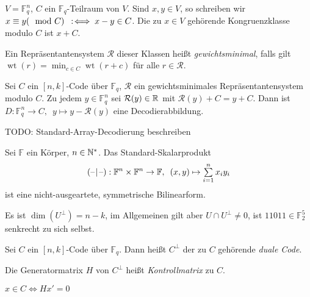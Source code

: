 \documentclass{cheat-sheet}
\newcommand{\F}{\mathbb{F}} %
\DeclareMathOperator{\wt}{wt} %
\newcommand{\scp}[2]{\left( #1 \!\mid\! #2 \right)} %
\begin{document}
$V = \F_q^n$, $C$ ein $\F_q$-Teilraum von $V$.
Sind $x, y \in V$, so schreiben wir $x \equiv y (\mod C) \enspace:\!\iff x-y \in C$.
Die zu $x \in V$ gehörende Kongruenzklasse modulo $C$ ist $x + C$.

\begin{defn}
  Ein Repräsentantensystem $\mathcal{R}$ dieser Klassen heißt \emph{gewichtsminimal}, falls gilt $\wt(r) = \min_{c \in C} \wt(r+c)$ für alle $r \in \mathcal{R}$.
\end{defn}

\begin{satz}
  Sei $C$ ein $[n, k]$-Code über $\F_q$, $\mathcal{R}$ ein gewichtsminimales Repräsentantensystem modulo $C$.
  Zu jedem $y \in \F_q^n$ sei $\mathcal{R}(y) \in \mathbb{R}$ mit $\mathcal{R}(y) + C = y + C$.
  Dann ist $D : \F_q^n \to C, \enspace y \mapsto y - \mathcal{R}(y)$ eine Decodierabbildung.
\end{satz}


TODO: Standard-Array-Decodierung beschreiben


\begin{bem}
  Sei $\F$ ein Körper, $n \in \mathbb{N}^*$.
  Das Standard-Skalarprodukt
  \[
    \scp{\blank}{\blank} : \F^n \times \F^n \to \F,
    \enspace (x, y) \mapsto \sum_{i=1}^n x_i y_i
  \]
  ist eine nicht-ausgeartete, symmetrische Bilinearform.
\end{bem}


\begin{acht}
  Es ist $\dim(U^\perp) = n - k$, im Allgemeinen gilt aber $U \cap U^\perp \neq 0$, \zB{} ist $11011 \in \F_2^5$ senkrecht zu sich selbst.
\end{acht}

\begin{defn}
  Sei $C$ ein $[n,k]$-Code über $\F_q$.
  Dann heißt $C^\perp$ der zu $C$ gehörende \emph{duale Code}.
\end{defn}

\begin{defn}
  Die Generatormatrix $H$ von $C^\perp$ heißt \emph{Kontrollmatrix} zu $C$.
\end{defn}

\begin{lem}
  $x \in C \iff Hx' = 0$
\end{lem}
\end{document}
